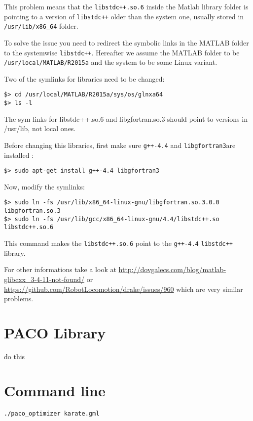 \documentclass[11pt,%
              a4paper,%
]{article}
\begin{document}
This problem means that the \texttt{libstdc++.so.6} inside the Matlab
library folder is pointing to a version of \texttt{libstdc++} older than
the system one, usually stored in \texttt{/usr/lib/x86\_64} folder.

To solve the issue you need to redirect the symbolic links in the MATLAB
folder to the systemwise \texttt{libstdc++}. Hereafter we assume the
MATLAB folder to be \texttt{/usr/local/MATLAB/R2015a} and the system to
be some Linux variant.

Two of the symlinks for libraries need to be changed:

\begin{verbatim}
$> cd /usr/local/MATLAB/R2015a/sys/os/glnxa64
$> ls -l
\end{verbatim}
The sym links for libstdc++.so.6 and libgfortran.so.3 should point to
versions in /usr/lib, not local ones.

Before changing this libraries, first make sure \texttt{g++-4.4} and
\texttt{libgfortran3}are installed :

\begin{verbatim}
$> sudo apt-get install g++-4.4 libgfortran3
\end{verbatim}
Now, modify the symlinks:

\begin{verbatim}
$> sudo ln -fs /usr/lib/x86_64-linux-gnu/libgfortran.so.3.0.0 libgfortran.so.3
$> sudo ln -fs /usr/lib/gcc/x86_64-linux-gnu/4.4/libstdc++.so libstdc++.so.6
\end{verbatim}

This command makes the \texttt{libstdc++.so.6} point to the
\texttt{g++-4.4} \texttt{libstdc++} library.

For other informations take a look at
\url{http://dovgalecs.com/blog/matlab-glibcxx\_3-4-11-not-found/} or 
\url{https://github.com/RobotLocomotion/drake/issues/960} which are very
similar problems.

\section{PACO Library}
do this

\section{Command line}
\begin{verbatim}
./paco_optimizer karate.gml
\end{verbatim}
\end{document}
